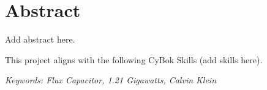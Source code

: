 \section*{Abstract}
\vspace{2cm}

\large
Add abstract here.

This project aligns with the following CyBok Skills (add skills here).

\vspace{1cm}

\noindent \textit{Keywords: Flux Capacitor, 1.21 Gigawatts, Calvin Klein}
